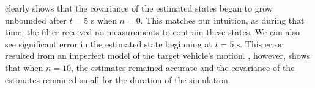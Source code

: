  clearly shows that the covariance
of the estimated
states began to grow unbounded after $t = 5$ s when $n = 0$.
This matches our intuition, as during that time, the filter received no measurements to contrain
these states.
We can also see significant error in the estimated state beginning at $t = 5$ s.
This error resulted from an imperfect model of the target vehicle's motion.
, however, shows that when $n = 10$,
the estimates remained accurate and the covariance of the estimates remained
small for the duration of the simulation.

